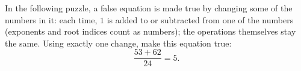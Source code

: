 In the following puzzle, a false equation is made true by changing some of the numbers in it: each time, $1$ is added to or subtracted from one of the numbers (exponents and root indices count as numbers); the operations themselves stay the same. Using exactly one change, make this equation true:
\[\dfrac{53+62}{24}=5.\]
